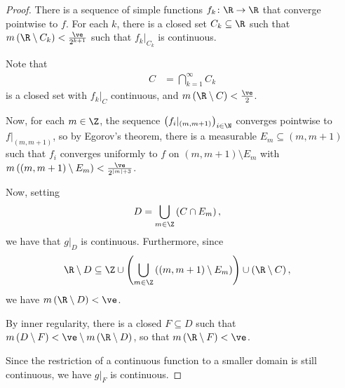 \documentclass[10pt]{mypackage}
\begin{document}
\begin{proof}
  There is a sequence of simple functions $f_k\colon \R\rightarrow \R$ that converge pointwise to $f$. For each $k$, there is a closed set $C_k\subseteq \R$ such that $m\left( \R\setminus C_k \right) < \frac{\ve }{2^{k+1}}$ such that $f_k|_{C_k}$ is continuous.\newline

  Note that
  \begin{align*}
    C &= \bigcap_{k=1}^{\infty}C_k
  \end{align*}
  is a closed set with $f_k|_{C}$ continuous, and $m\left( \R\setminus C \right) < \frac{\ve}{2}$.\newline

  Now, for each $m\in \Z$, the sequence $\left( f_i|_{(m,m+1)} \right)_{i\in\N}$ converges pointwise to $f|_{(m,m+1)}$, so by Egorov's theorem, there is a measurable $E_m\subseteq (m,m+1)$ such that $f_i$ converges uniformly to $f$ on $\left( m,m+1 \right)\setminus E_m$ with $m\left( \left( m,m+1 \right)\setminus E_m \right) < \frac{\ve}{2^{\left\vert m \right\vert + 3}}$.\newline

  Now, setting
  \begin{align*}
    D &= \bigcup_{m\in\Z}\left( C\cap E_m \right),
  \end{align*}
  we have that $g|_{D}$ is continuous. Furthermore, since
  \begin{align*}
    \R\setminus D &\subseteq \Z\cup \left( \bigcup_{m\in\Z}\left( \left( m,m+1 \right)\setminus E_m \right) \right)\cup \left( \R\setminus C \right),
  \end{align*}
  we have $m\left( \R\setminus D \right) < \ve$.\newline

  By inner regularity, there is a closed $F\subseteq D$ such that $m\left( D\setminus F \right) < \ve\setminus m\left( \R\setminus D \right)$, so that $m\left( \R\setminus F \right) < \ve$.\newline

  Since the restriction of a continuous function to a smaller domain is still continuous, we have $g|_{F}$ is continuous.
\end{proof}
\end{document}
